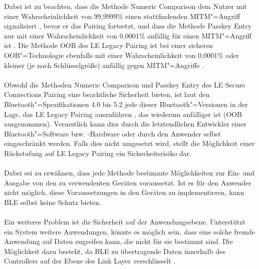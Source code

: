 Dabei ist zu beachten, dass die Methode Numeric Comparison dem Nutzer mit einer Wahrscheinlichkeit von 99,9999\% einen stattfindenden MITM"=Angriff signalisiert \cite{BtSpec4.2_2309}, bevor er das Pairing fortsetzt, und dass die Methode Passkey Entry nur mit einer Wahrscheinlichkeit von 0,0001\% anfällig für einen MITM"=Angriff ist \cite{BtSpec4.2_2304} \cite{BtSpec4.2_2311}. Die Methode OOB des LE Legacy Pairing ist bei einer sicheren OOB"=Technologie ebenfalls mit einer Wahrscheinlichkeit von 0,0001\% oder kleiner (je nach Schlüsselgröße) anfällig gegen MITM"=Angriffe \cite{BtSpec4.2_2305}.
\\\\
Obwohl die Methoden Numeric Comparison und Passkey Entry des LE Secure Connections Pairing eine beachtliche Sicherheit bieten, ist laut den Bluetooth"=Spezifikationen 4.0 bis 5.2 jede dieser Bluetooth"=Versionen in der Lage, das LE Legacy Pairing auszuführen \cite{BtSpec4.2_248_b} \cite{BtSpec5.2_277}, das wiederum anfälliger ist (OOB ausgenommen). 
Vermutlich kann dies durch die letztendlichen Entwickler einer Bluetooth"=Software bzw. -Hardware oder durch den Anwender selbst eingeschränkt werden. Falls dies nicht umgesetzt wird, stellt die Möglichkeit einer Rückstufung auf LE Legacy Pairing ein Sicherheitsrisiko dar.
\\\\
Dabei sei zu erwähnen, dass jede Methode bestimmte Möglichkeiten zur Ein- und Ausgabe von den zu verwendenten Geräten voraussetzt. Ist es für den Anwender nicht möglich, diese Voraussetzungen in den Geräten zu implementieren, kann BLE selbst keine Schutz bieten.
\\\\
Ein weiteres Problem ist die Sicherheit auf der Anwendungsebene. Unterstützt ein System weitere Anwendungen, könnte es möglich sein, dass eine solche fremde Anwendung auf Daten zugreifen kann, die nicht für sie bestimmt sind. Die Möglichkeit dazu besteht, da BLE zu übertragende Daten innerhalb des Controllers auf der Ebene des Link Layer verschlüsselt \cite{BtSpec4.0_196} \cite{BtSpec4.0_2285}. 
